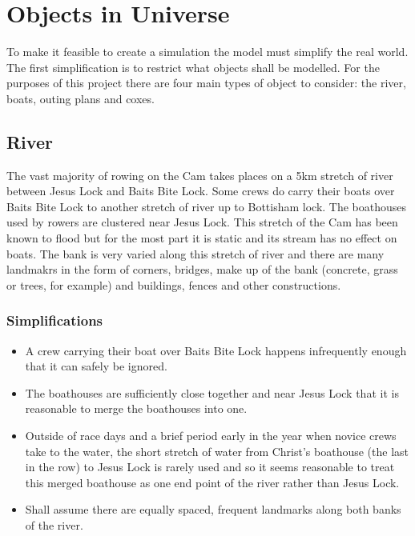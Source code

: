 \section{Objects in Universe}

To make it feasible to create a simulation the model must simplify the real world. The first simplification is to restrict what objects shall be modelled. For the purposes of this project there are four main types of object to consider: the river, boats, outing plans and coxes. 

\subsection{River} \label{riversubsec}
The vast majority of rowing on the Cam takes places on a 5km stretch
of river between Jesus Lock and Baits Bite Lock. Some crews do carry
their boats over Baits Bite Lock to another stretch of river up to
Bottisham lock. The boathouses used by rowers are clustered near Jesus
Lock. This stretch of the Cam has been known to flood but for the most
part it is static and its stream has no effect on boats. The bank is
very varied along this stretch of river and there are many landmakrs
in the form of corners, bridges, make up of the bank (concrete, grass
or trees, for example) and buildings, fences and other constructions.

\subsubsection{Simplifications}
\begin{itemize}
  \item A crew carrying their boat over Baits Bite Lock happens infrequently enough that it can safely be ignored.
  \item The boathouses are sufficiently close together and near Jesus Lock that it is reasonable to merge the boathouses into one. 
  \item Outside of race days and a brief period early in the year when
    novice crews take to the water, the short stretch of water from
    Christ's boathouse (the last in the row) to Jesus Lock is rarely
    used and so it seems reasonable to treat this merged boathouse as
    one end point of the river rather than Jesus Lock.
  \item Shall assume there are equally spaced, frequent landmarks
    along both banks of the river.
\end{itemize}

